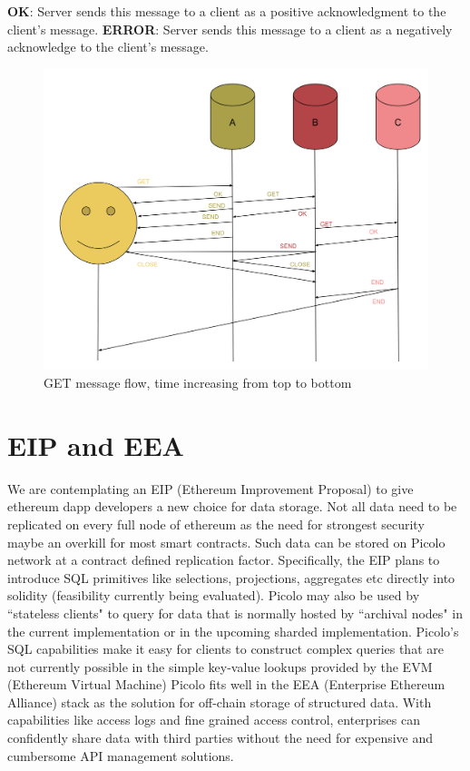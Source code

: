 \documentclass[preprint,10pt]{elsarticle}
\newcommand{\fscale}[1]{#1\linewidth}
\begin{document}
\newline
\textbf{OK}: Server sends this message to a client as a positive acknowledgment to the client's message.
\newline
\newline
\textbf{ERROR}: Server sends this message to a client as a negatively acknowledge to the client's message.
\begin{figure}[h!] \centering
	\includegraphics[width=\fscale{1}]{mx.png}
	\caption{GET message flow, time increasing from top to bottom}
	\label{fig:mx}
\end{figure}

\section{EIP and EEA}
We are contemplating an EIP (Ethereum Improvement Proposal) to give ethereum dapp developers a new choice for data storage. Not all data need to be replicated on every full node of ethereum as the need for strongest security maybe an overkill for most smart contracts. Such data can be stored on Picolo network at a contract defined replication factor. Specifically, the EIP plans to introduce SQL primitives like selections, projections, aggregates etc directly into solidity (feasibility currently being evaluated).
\newline
\newline
Picolo may also be used by ``stateless clients" to query for data that is normally hosted by ``archival nodes" in the current implementation or in the upcoming sharded implementation. Picolo's SQL capabilities make it easy for clients to construct complex queries that are not currently possible in the simple key-value lookups provided by the EVM (Ethereum Virtual Machine)
\newline\newline
Picolo fits well in the EEA (Enterprise Ethereum Alliance) stack as the solution for off-chain storage of structured data. With capabilities like access logs and fine grained access control, enterprises can confidently share data with third parties without the need for expensive and cumbersome API management solutions.
\end{document}
